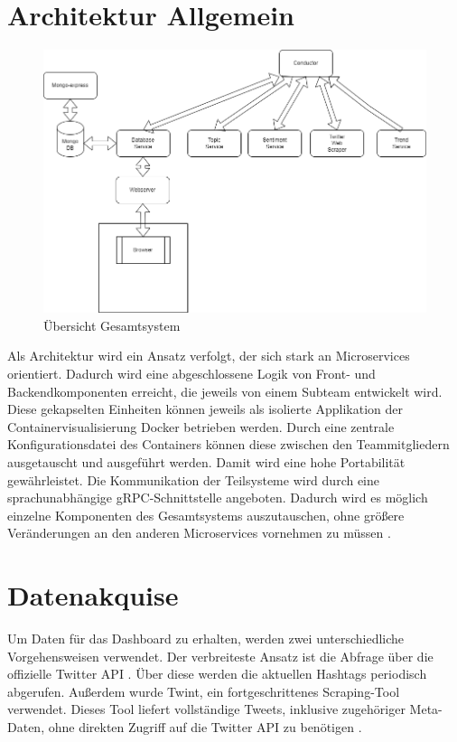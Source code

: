\documentclass[conference]{IEEEtran}
\begin{document}
\section{Architektur Allgemein}
\begin{figure}
    \centering
    \includegraphics[width=\textwidth]{Architecture.png}
    \caption{Übersicht Gesamtsystem}
\end{figure}

Als Architektur wird ein Ansatz verfolgt, der sich stark an Microservices orientiert.
Dadurch wird eine abgeschlossene Logik von Front- und Backendkomponenten erreicht, die jeweils
von einem Subteam entwickelt wird. Diese gekapselten Einheiten können jeweils als isolierte Applikation der Containervisualisierung Docker betrieben werden.
Durch eine zentrale Konfigurationsdatei des Containers können diese zwischen den Teammitgliedern
ausgetauscht und ausgeführt werden. Damit wird eine hohe Portabilität gewährleistet.
Die Kommunikation der Teilsysteme wird durch eine sprachunabhängige gRPC-Schnittstelle angeboten.
Dadurch wird es möglich einzelne Komponenten des Gesamtsystems auszutauschen,
ohne größere Veränderungen an den anderen Microservices vornehmen zu müssen \cite{microservices}.


\section{Datenakquise}
Um Daten für das Dashboard zu erhalten, werden zwei unterschiedliche Vorgehensweisen verwendet.
Der verbreiteste Ansatz ist die Abfrage über die offizielle Twitter API \cite{twitterapi}.
Über diese werden die aktuellen Hashtags periodisch abgerufen.
Außerdem wurde Twint, ein fortgeschrittenes Scraping-Tool verwendet.
Dieses Tool liefert vollständige Tweets, inklusive zugehöriger Meta-Daten,
ohne direkten Zugriff auf die Twitter API zu benötigen \cite{twint}.
\end{document}
